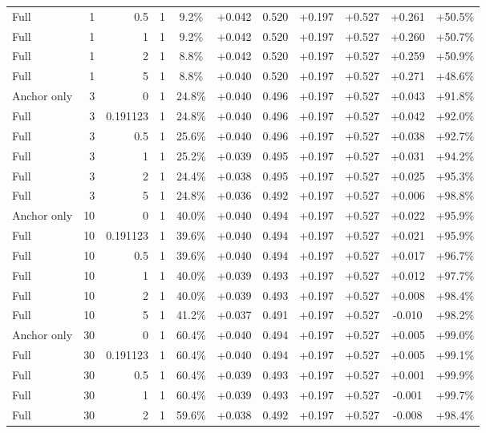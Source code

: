 \begin{table}[htbp]
\begin{tabular}{lrrrccccccc}
Full & 1 & 0.5 & 1 & 9.2\% & +0.042 & 0.520 & +0.197 & +0.527 & +0.261 & +50.5\% \\
Full & 1 & 1 & 1 & 9.2\% & +0.042 & 0.520 & +0.197 & +0.527 & +0.260 & +50.7\% \\
Full & 1 & 2 & 1 & 8.8\% & +0.042 & 0.520 & +0.197 & +0.527 & +0.259 & +50.9\% \\
Full & 1 & 5 & 1 & 8.8\% & +0.040 & 0.520 & +0.197 & +0.527 & +0.271 & +48.6\% \\
Anchor only & 3 & 0 & 1 & 24.8\% & +0.040 & 0.496 & +0.197 & +0.527 & +0.043 & +91.8\% \\
Full & 3 & 0.191123 & 1 & 24.8\% & +0.040 & 0.496 & +0.197 & +0.527 & +0.042 & +92.0\% \\
Full & 3 & 0.5 & 1 & 25.6\% & +0.040 & 0.496 & +0.197 & +0.527 & +0.038 & +92.7\% \\
Full & 3 & 1 & 1 & 25.2\% & +0.039 & 0.495 & +0.197 & +0.527 & +0.031 & +94.2\% \\
Full & 3 & 2 & 1 & 24.4\% & +0.038 & 0.495 & +0.197 & +0.527 & +0.025 & +95.3\% \\
Full & 3 & 5 & 1 & 24.8\% & +0.036 & 0.492 & +0.197 & +0.527 & +0.006 & +98.8\% \\
Anchor only & 10 & 0 & 1 & 40.0\% & +0.040 & 0.494 & +0.197 & +0.527 & +0.022 & +95.9\% \\
Full & 10 & 0.191123 & 1 & 39.6\% & +0.040 & 0.494 & +0.197 & +0.527 & +0.021 & +95.9\% \\
Full & 10 & 0.5 & 1 & 39.6\% & +0.040 & 0.494 & +0.197 & +0.527 & +0.017 & +96.7\% \\
Full & 10 & 1 & 1 & 40.0\% & +0.039 & 0.493 & +0.197 & +0.527 & +0.012 & +97.7\% \\
Full & 10 & 2 & 1 & 40.0\% & +0.039 & 0.493 & +0.197 & +0.527 & +0.008 & +98.4\% \\
Full & 10 & 5 & 1 & 41.2\% & +0.037 & 0.491 & +0.197 & +0.527 & -0.010 & +98.2\% \\
Anchor only & 30 & 0 & 1 & 60.4\% & +0.040 & 0.494 & +0.197 & +0.527 & +0.005 & +99.0\% \\
Full & 30 & 0.191123 & 1 & 60.4\% & +0.040 & 0.494 & +0.197 & +0.527 & +0.005 & +99.1\% \\
Full & 30 & 0.5 & 1 & 60.4\% & +0.039 & 0.493 & +0.197 & +0.527 & +0.001 & +99.9\% \\
Full & 30 & 1 & 1 & 60.4\% & +0.039 & 0.493 & +0.197 & +0.527 & -0.001 & +99.7\% \\
Full & 30 & 2 & 1 & 59.6\% & +0.038 & 0.492 & +0.197 & +0.527 & -0.008 & +98.4\% \\

\end{tabular}
\end{table}
